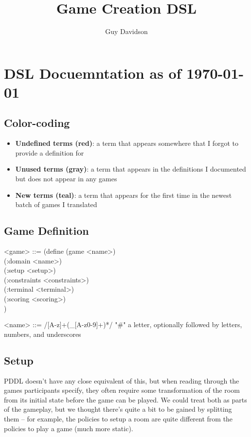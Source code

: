 \documentclass{article}
\title{Game Creation DSL}
\author{Guy Davidson}
\begin{document}
\maketitle

\section{DSL Docuemntation as of \today}

\subsection*{Color-coding}
\begin{itemize}
\item {\color{red} \textbf{Undefined terms (red)}}: a term that appears somewhere that I forgot to provide a definition for
\item {\color{gray} \textbf{Unused terms (gray)}}: a term that appears in the definitions I documented but does not appear in any games
\item {\color{teal} \textbf{New terms (teal)}}: a term that appears for the first time in the newest batch of games I translated
\end{itemize}
\subsection{Game Definition}
\begin{grammar}
<game> ::= (define (game <name>) \\
  (:domain <name>) \\
  (:setup <setup>) \\
  (:constraints <constraints>) \\
  (:terminal <terminal>) \\
  (:scoring <scoring>) \\)

<name> ::= /[A-z]+(_[A-z0-9]+)*/ "#" a letter, optionally followed by letters, numbers, and underscores
\end{grammar}

\subsection{Setup}
PDDL doesn't have any close equivalent of this, but when reading through the games participants specify,
        they often require some transformation of the room from its initial state before the game can be played.
        We could treat both as parts of the gameplay, but we thought there's quite a bit to be gained by splitting them -- for example,
        the policies to setup a room are quite different from the policies to play a game (much more static). \\
\end{document}
